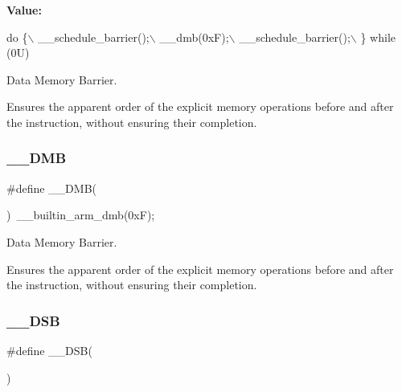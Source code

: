 {\bfseries Value\+:}
\begin{DoxyCode}
\textcolor{keywordflow}{do} \{\(\backslash\)
                   \_\_schedule\_barrier();\(\backslash\)
                   \_\_dmb(0xF);\(\backslash\)
                   \_\_schedule\_barrier();\(\backslash\)
                \} \textcolor{keywordflow}{while} (0U)
\end{DoxyCode}


Data Memory Barrier. 

Ensures the apparent order of the explicit memory operations before and after the instruction, without ensuring their completion. \mbox{\label{group___c_m_s_i_s___core___instruction_interface_ga671101179b5943990785f36f8c1e2269}} 
\subsubsection{\texorpdfstring{\+\_\+\+\_\+\+D\+MB}{\_\_DMB}\hspace{0.1cm}{\footnotesize\ttfamily [2/2]}}
{\footnotesize\ttfamily \#define \+\_\+\+\_\+\+D\+MB(\begin{DoxyParamCaption}{ }\end{DoxyParamCaption})~\+\_\+\+\_\+builtin\+\_\+arm\+\_\+dmb(0x\+F);}



Data Memory Barrier. 

Ensures the apparent order of the explicit memory operations before and after the instruction, without ensuring their completion. \mbox{\label{group___c_m_s_i_s___core___instruction_interface_ga067d257a2b34565410acefb5afef2203}} 
\subsubsection{\texorpdfstring{\+\_\+\+\_\+\+D\+SB}{\_\_DSB}\hspace{0.1cm}{\footnotesize\ttfamily [1/2]}}
{\footnotesize\ttfamily \#define \+\_\+\+\_\+\+D\+SB(\begin{DoxyParamCaption}{ }\end{DoxyParamCaption})}

